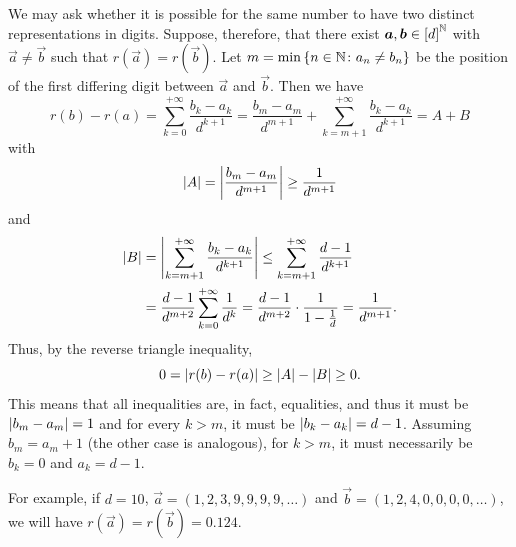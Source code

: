 We may ask whether it is possible for the same number 
to have two distinct representations in digits.
Suppose, therefore, that there exist $\boldsymbol a,\boldsymbol b\in {\left[ d \right]}^{\mathbb N}$
with $\vec a \neq \vec b$ 
such that $r(\vec a) = r(\vec b)$. 
Let $m = \min{\left\{ n\in{\mathbb N}\colon a_n\neq b_n \right\}}$ be the position 
of the first differing digit between $\vec a$ and $\vec b$.
Then we have 
\[
 r(b) - r(a) = \sum_{k=0}^{+\infty}\frac{b_k - a_k}{d^{k+1}}
 = \frac{b_m - a_m}{d^{m+1}} + \sum_{k=m+1}^{+\infty} \frac{b_k - a_k}{d^{k+1}}
 = A+B
\]
with 
\[
{\left|A\right|} = {\left|\frac{b_m - a_m}{d^{m+1}}\right|} \ge \frac{1}{d^{m+1}}  
\]
and 
\begin{align*}
{\left|B\right|} &= {\left|\sum_{k=m+1}^{+\infty} \frac{b_k - a_k}{d^{k+1}}\right|}
        \le \sum_{k=m+1}^{+\infty} \frac{d-1}{d^{k+1}}\\
        &= \frac{d-1}{d^{m+2}}\sum_{k=0}^{+\infty}\frac{1}{d^k}
        = \frac{d-1}{d^{m+2}}\cdot \frac{1}{1-\frac 1 d} = \frac{1}{d^{m+1}}.
\end{align*}
Thus, by the reverse triangle inequality,
\[
0 = {\left|r(b)-r(a)\right|}\ge {\left|A\right|} - {\left|B\right|} \ge 0.  
\]
This means that all inequalities are, in fact, equalities,
and thus it must be ${\left|b_m-a_m\right|}=1$ 
and for every $k>m$, it must be ${\left|b_k-a_k\right|}=d-1$. 
Assuming $b_m=a_m+1$ (the other case is analogous),
for $k>m$, it must necessarily be $b_k=0$ and $a_k=d-1$.

For example, if $d=10$, $\vec a = (1,2,3,9,9,9,9,\dots )$ 
and $\vec b = (1,2,4,0,0,0,0,\dots)$, we will have 
$r(\vec a) = r(\vec b) = 0.124$.